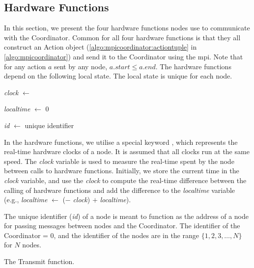 \subsection{Hardware Functions}\label{sec:hwfuncspseudo}
In this section, we present the four hardware functions nodes use to communicate with the Coordinator. Common
for all four hardware functions is that they all construct an Action object
(\autoref{algo:mpicoordinator:actiontuple} in \autoref{algo:mpicoordinator}) and send it to the Coordinator
using the \gls{mpi}. Note that for any action $a$ sent by any node, $a.\mathit{start} \leq a.\mathit{end}$.
The hardware functions depend on the following local state. The local state is unique for each node.
\smallbreak

\textit{clock} $\leftarrow$ \KwNow

\textit{localtime} $\leftarrow$ 0

\textit{id} $\leftarrow$ unique identifier \smallbreak

In the hardware functions, we utilise a special keyword \KwNow, which represents the real-time hardware clocks
of a node. It is assumed that all clocks run at the same speed. The \textit{clock} variable is used to measure
the real-time spent by the node between calls to hardware functions. Initially, we store the current time in
the \textit{clock} variable, and use the \textit{clock} to compute the real-time difference between the
calling of hardware functions and add the difference to the \textit{localtime} variable (e.g.,
\textit{localtime} $\leftarrow$ (\KwNow $-$ \textit{clock}) $+$ \textit{localtime}).

The unique identifier (\textit{id}) of a node is meant to function as the address of a node for passing
messages between nodes and the Coordinator. The identifier of the Coordinator = $0$, and the identifier of the
nodes are in the range $\{ 1, 2, 3, \ldots, N \}$ for $N$ nodes.

\begin{algorithm}[ht]
    \DontPrintSemicolon
    

    \caption{The Transmit function.}
    \label{algo:hwfuncstransmit}
\end{algorithm}

